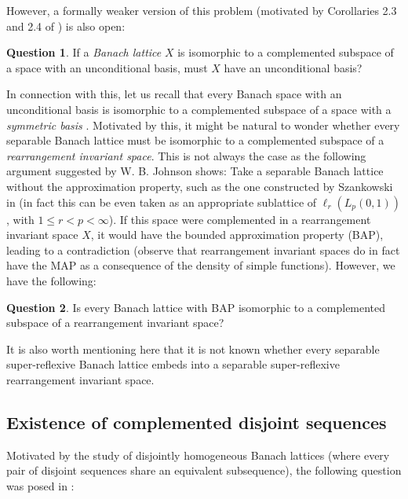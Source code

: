 \documentclass[11pt]{amsart}
\theoremstyle{definition}
\newtheorem{question}{Question}
\numberwithin{equation}{section}
\begin{document}
However, a formally weaker version of this problem (motivated by Corollaries 2.3 and 2.4 of \cite{dHMST23}) is also open:

\begin{question}
If a \textit{Banach lattice} $X$ is isomorphic to a complemented subspace of a space with an unconditional basis, must $X$ have an unconditional basis?
\end{question}

In connection with this, let us recall that every Banach space with an unconditional basis is isomorphic to a complemented subspace of a space with a \emph{symmetric basis} \cite{Li72}. Motivated by this, it might be natural to wonder whether every separable Banach lattice must be isomorphic to a complemented subspace of a \emph{rearrangement invariant space}. This is not always the case as the following argument suggested by W. B. Johnson shows: Take a separable Banach lattice without the approximation property, such as the one constructed by Szankowski in \cite{Szankowski} (in fact this can be even taken as an appropriate sublattice of $\ell_r(L_p(0,1))$, with $1\leq r<p<\infty$). If this space were complemented in a rearrangement invariant space $X$, it would have the bounded approximation property (BAP), leading to a contradiction (observe that rearrangement invariant spaces do in fact have the MAP as a consequence of the density of simple functions). However, we have the following:

\begin{question}
Is every Banach lattice with BAP isomorphic to a complemented subspace of a rearrangement invariant space?
\end{question}

It is also worth mentioning here that it is not known whether every separable super-reflexive Banach lattice embeds into a separable super-reflexive rearrangement invariant space. 



\subsection{Existence of complemented disjoint sequences}
Motivated by the study of disjointly homogeneous Banach lattices (where every pair of disjoint sequences share an equivalent subsequence), the following question was posed in \cite{FHSTT}:
\end{document}
